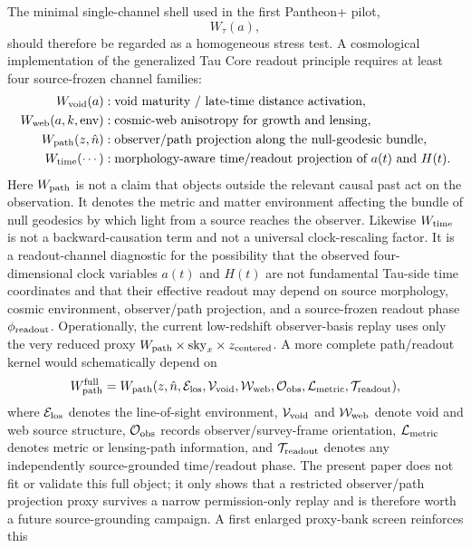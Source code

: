 \documentclass[11pt]{article}
\begin{document}
The minimal single-channel shell used in the first Pantheon+ pilot,
\[
W_\tau(a),
\]
should therefore be regarded as a homogeneous stress test. A cosmological
implementation of the generalized Tau Core readout principle requires at least
four source-frozen channel families:
\begin{align}
W_{\rm void}(a) &: \hbox{void maturity / late-time distance activation},\\
W_{\rm web}(a,k,\mathrm{env}) &: \hbox{cosmic-web anisotropy for growth and lensing},\\
W_{\rm path}(z,\hat n) &: \hbox{observer/path projection along the null-geodesic bundle},\\
W_{\rm time}(\cdots)
  &: \hbox{morphology-aware time/readout projection of } a(t)\hbox{ and }H(t).
\end{align}
Here \(W_{\rm path}\) is not a claim that objects outside the relevant causal
past act on the observation. It denotes the metric and matter environment
affecting the bundle of null geodesics by which light from a source reaches the
observer. Likewise \(W_{\rm time}\) is not a backward-causation term and not a
universal clock-rescaling factor.  It is a readout-channel diagnostic for the
possibility that the observed four-dimensional clock variables \(a(t)\) and
\(H(t)\) are not fundamental Tau-side time coordinates and that their effective
readout may depend on source morphology, cosmic environment, observer/path
projection, and a source-frozen readout phase \(\phi_{\rm readout}\).
Operationally, the current low-redshift observer-basis replay uses only the
very reduced proxy \(W_{\rm path}\times\mathrm{sky}_x\times z_{\rm centered}\).
A more complete path/readout kernel would schematically depend on
\[
W_{\rm path}^{\rm full}
  =W_{\rm path}(z,\hat n,\mathcal E_{\rm los},
      \mathcal V_{\rm void},\mathcal W_{\rm web},
      \mathcal O_{\rm obs},\mathcal L_{\rm metric},\mathcal T_{\rm readout}),
\]
where \(\mathcal E_{\rm los}\) denotes the line-of-sight environment,
\(\mathcal V_{\rm void}\) and \(\mathcal W_{\rm web}\) denote void and web
source structure, \(\mathcal O_{\rm obs}\) records observer/survey-frame
orientation, \(\mathcal L_{\rm metric}\) denotes metric or lensing-path
information, and \(\mathcal T_{\rm readout}\) denotes any independently
source-grounded time/readout phase.  The present paper does not fit or validate
this full object; it only shows that a restricted observer/path projection proxy
survives a narrow permission-only replay and is therefore worth a future
source-grounding campaign.  A first enlarged proxy-bank screen reinforces this
\end{document}
